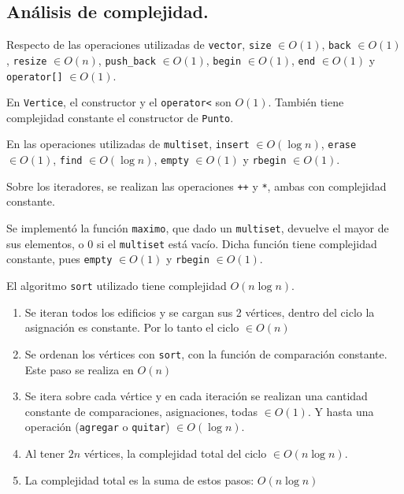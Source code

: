 \subsection{Análisis de complejidad.}

\vspace*{0.3cm}

Respecto de las operaciones utilizadas de \verb|vector|, \verb|size| $\in O(1)$,
\verb|back| $\in O(1)$, \verb|resize| $\in O(n)$, \verb|push_back| $\in O(1)$,
\verb|begin| $\in O(1)$, \verb|end| $\in O(1)$ y \verb|operator[]| $\in O(1)$.

\noindent
En \verb|Vertice|, el constructor y el \verb|operator<| son $O(1)$. También
tiene complejidad constante el constructor de \verb|Punto|.

\noindent
En las operaciones utilizadas de \verb|multiset|, \verb|insert| $\in O(\log n)$,
\verb|erase| $\in O(1)$, \verb|find| $\in O(\log n)$, \verb|empty| $\in O(1)$ y
\verb|rbegin| $\in O(1)$.

\noindent
Sobre los iteradores, se realizan las operaciones \verb|++| y \verb|*|, ambas
con complejidad constante.

\noindent
Se implementó la función \verb|maximo|, que dado un \verb|multiset|, devuelve
el mayor de sus elementos, o 0 si el \verb|multiset| está vacío. Dicha función
tiene complejidad constante, pues \verb|empty| $\in O(1)$ y \verb|rbegin| $\in O(1)$.

\noindent
El algoritmo \verb|sort| utilizado tiene complejidad $O(n \log n)$.

\noindent

\begin{enumerate}
  \item Se iteran todos los edificios y se cargan sus 2 vértices, dentro
  del ciclo la asignación es constante. Por lo tanto el ciclo $\in O(n)$

  \item Se ordenan los vértices con \verb|sort|, con la función de comparación
  constante. Este paso se realiza en $O(n)$

  \item Se itera sobre cada vértice y en cada iteración se realizan una cantidad
  constante de comparaciones, asignaciones, todas $\in O(1)$. Y hasta una operación
  (\verb|agregar| o \verb|quitar|) $\in O(\log n)$.

  \item Al tener $2n$ vértices, la complejidad total del ciclo $\in O(n \log n)$.

  \item La complejidad total es la suma de estos pasos: $O(n \log n)$
\end{enumerate}



